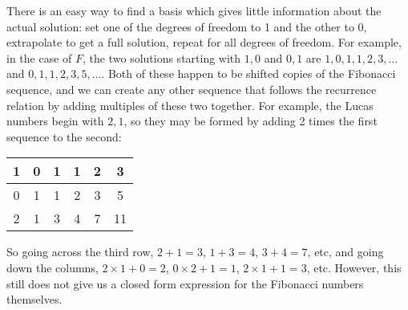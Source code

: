 \documentclass{article}
\begin{document}
There is an easy way to find a basis
which gives little information about the actual solution:
set one of the degrees of freedom to 1 and the other to 0,
extrapolate to get a full solution,
repeat for all degrees of freedom.
For example, in the case of $F$,
the two solutions starting with $1, 0$ and $0, 1$
are $1, 0, 1, 1, 2, 3, \ldots$ and $0, 1, 1, 2, 3, 5, \ldots$.
Both of these happen to be shifted copies of the Fibonacci sequence,
and we can create any other sequence that follows the recurrence relation
by adding multiples of these two together.
For example, the Lucas numbers begin with $2, 1$,
so they may be formed by adding 2 times the first sequence
to the second:
\begin{center}
  \begin{tabular}{|c|c|c|c|c|c|}
    \hline
    1 & 0 & 1 & 1 & 2 & 3 \\ \hline
    0 & 1 & 1 & 2 & 3 & 5 \\ \hline
    2 & 1 & 3 & 4 & 7 & 11 \\ \hline
  \end{tabular}
\end{center}
So going across the third row,
$2+1=3$, $1+3=4$, $3+4=7$, etc,
and going down the columns,
$2 \times 1 + 0 = 2$, $0 \times 2 + 1 = 1$, $2 \times 1 + 1 = 3$, etc.
However, this still does not give us a closed form expression
for the Fibonacci numbers themselves.



\end{document}
